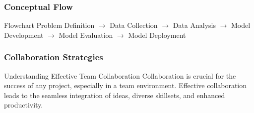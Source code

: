 \documentclass[aspectratio=169]{beamer}
\begin{document}
\begin{frame}
    \frametitle{Conceptual Flow}
    \begin{block}{Flowchart}
        Problem Definition $\rightarrow$ Data Collection $\rightarrow$ Data Analysis $\rightarrow$ Model Development $\rightarrow$ Model Evaluation $\rightarrow$ Model Deployment
    \end{block}
\end{frame}

\begin{frame}[fragile]
    \frametitle{Collaboration Strategies}
    \begin{block}{Understanding Effective Team Collaboration}
        Collaboration is crucial for the success of any project, especially in a team environment. Effective collaboration leads to the seamless integration of ideas, diverse skillsets, and enhanced productivity.
    \end{block}
\end{frame}
\end{document}
